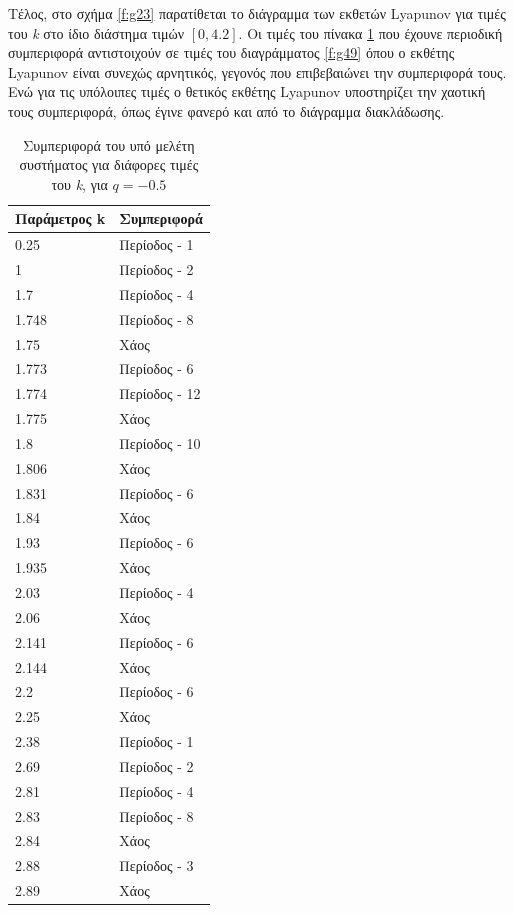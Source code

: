 Τέλος, στο σχήμα \ref{f:g23} παρατίθεται το διάγραμμα των εκθετών Lyapunov για τιμές του \emph{k} στο ίδιο διάστημα τιμών $[0, 4.2]$. Οι τιμές του πίνακα \ref{tab:abc11} που έχουνε περιοδική συμπεριφορά αντιστοιχούν σε τιμές του διαγράμματος \ref{f:g49} όπου ο εκθέτης Lyapunov είναι συνεχώς αρνητικός, γεγονός που επιβεβαιώνει την συμπεριφορά τους. Ενώ για τις υπόλοιπες τιμές ο θετικός εκθέτης Lyapunov υποστηρίζει την χαοτική τους συμπεριφορά, όπως έγινε φανερό και από το διάγραμμα διακλάδωσης.





\begin{table}[ht]
	\centering
	\caption{ Συμπεριφορά του υπό μελέτη συστήματος για διάφορες τιμές του \emph{k}, για $q=-0.5$ }
	\label{tab:abc11}
	\begin{tabular}{l | l}
		Παράμετρος k & Συμπεριφορά \\
		\hline
		0.25 &  Περίοδος -  1 \\
		1 &  Περίοδος -  2 \\
		1.7& Περίοδος -  4 \\
		1.748& Περίοδος -  8 \\
		1.75 & Xάος \\
		1.773& Περίοδος - 6 \\
		1.774& Περίοδος - 12\\
		1.775& Χάος \\
		1.8& Περίοδος - 10 \\
		1.806 &  Χάος \\
		1.831 &  Περίοδος -  6 \\
		1.84 &  Χάος \\
		1.93 & Περίοδος - 6\\
		1.935 &Χάος \\
		2.03 &  Περίοδος -  4\\
		2.06 &Χάος \\
		2.141 & Περίοδος -  6\\
		2.144& Χάος\\
		2.2& Περίοδος - 6\\
		2.25& Χάος\\
		2.38 & Περίοδος -  1\\
		2.69 & Περίοδος -  2\\
		2.81 & Περίοδος -  4\\
		2.83 & Περίοδος -  8\\
		2.84 & Χάος\\
		2.88& Περίοδος -  3\\
		2.89 & Χάος\\

\end{tabular}
\end{table}
